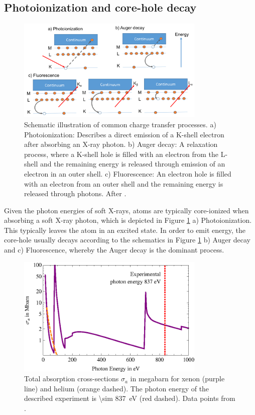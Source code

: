 \subsection{Photoionization and core-hole decay}\label{sec:absorption}
%
\begin{figure}
	\centering
		\includegraphics[width=0.80\textwidth]{images/el-relaxation.png}
	\caption[Schematic illustration of common charge transfer processes]{Schematic illustration of common charge transfer processes. a) Photoionization: Describes a direct emission of a K-shell electron after absorbing an X-ray photon. b) Auger decay: A relaxation process, where a K-shell hole is filled with an electron from the L-shell and the remaining energy is released through emission of an electron in an outer shell. c) Fluorescence: An electron hole is filled with an electron from an outer shell and the remaining energy is released through photons. After \citep{Als-Nielson-2011-JWS}.}
	\label{fig:el-relaxation}
\end{figure}
%
Given the photon energies of soft X-rays, atoms are typically core-ionized when absorbing a soft X-ray photon, which is depicted in Figure \ref{fig:el-relaxation} a) Photoionization. This typically leaves the atom in an excited state. In order to emit energy, the core-hole usually decays according to the schematics in Figure \ref{fig:el-relaxation} b) Auger decay and c) Fluorescence, whereby the Auger decay is the dominant process.\\[1\baselineskip]
%
%
%
\begin{figure}
	\centering
		\includegraphics[width=0.80\textwidth]{images/photoionization.eps}
	\caption[Total absorption cross-sections for helium and xenon.]{Total absorption cross-sections $\sigma_{a}$ in megabarn for xenon (purple line) and helium (orange dashed). The photon energy of the described experiment is \SI{\sim 837}{\electronvolt} (red dashed). Data points from \citep{Elettra-2016-Website,Yeh-1985-AtmDat,Yeh-1993-GBSP}.}
	\label{fig:photoionization}
\end{figure}
